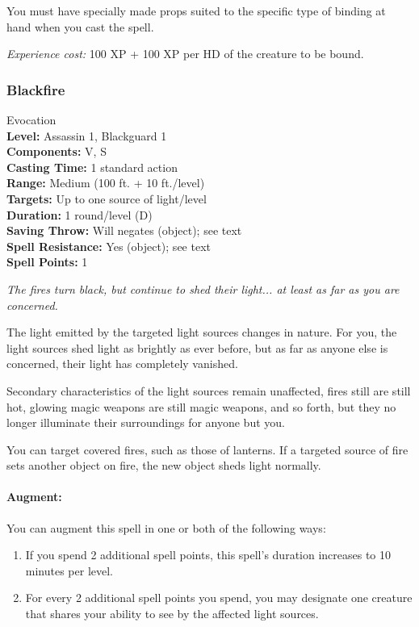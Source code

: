 You must have specially made props suited to the specific type of binding at hand when you cast the spell.

\emph{Experience cost:} 100 XP + 100 XP per HD of the creature to be bound.
\subsubsection{Blackfire}
\label{Spell:Blackfire}
Evocation
\\ \textbf{Level:} Assassin 1, Blackguard 1
\\ \textbf{Components:} V, S
\\ \textbf{Casting Time:} 1 standard action
\\ \textbf{Range:} Medium (100 ft. + 10 ft./level)
\\ \textbf{Targets:} Up to one source of light/level
\\ \textbf{Duration:} 1 round/level (D)
\\ \textbf{Saving Throw:} Will negates (object); see text
\\ \textbf{Spell Resistance:} Yes (object); see text
\\ \textbf{Spell Points:} 1

\emph{The fires turn black, but continue to shed their light... at least as far as you are concerned.}

The light emitted by the targeted light sources changes in nature.
For you, the light sources shed light as brightly as ever before, but as far as anyone else is concerned, their light has completely vanished.

Secondary characteristics of the light sources remain unaffected, fires still are still hot, glowing magic weapons are still magic weapons, and so forth, but they no longer illuminate their surroundings for anyone but you.

You can target covered fires, such as those of lanterns. If a targeted source of fire sets another object on fire, the new object sheds light normally.

\paragraph{Augment:} You can augment this spell in one or both of the following ways:
\begin{enumerate}
 \item If you spend 2 additional spell points, this spell's duration increases to 10 minutes per level.
 \item For every 2 additional spell points you spend, you may designate one creature that shares your ability to see by the affected light sources.
\end{enumerate}
